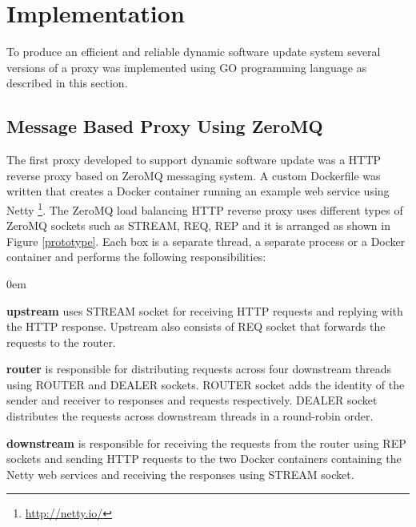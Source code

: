 \documentclass[a4paper,11pt,twoside]{article}
\begin{document}
\clearpage
\section{Implementation} \label{Implementation}
To produce an efficient and reliable dynamic software update system several versions of a proxy was implemented using GO programming language as described in this section. 

\subsection{Message Based Proxy Using ZeroMQ}
The first proxy developed to support dynamic software update was a HTTP reverse proxy based on ZeroMQ messaging system. A custom Dockerfile was written that creates a Docker container running an example web service using Netty \footnote{\url{http://netty.io/}}. The ZeroMQ load balancing HTTP reverse proxy uses different types of ZeroMQ sockets such as STREAM, REQ, REP and it is arranged as shown in Figure \ref{prototype}. Each box is a separate thread, a separate process or a Docker container and performs the following responsibilities:
 
\begin{list}{-}{}
  \itemsep0em
  \item \textbf{upstream} uses STREAM socket for receiving HTTP requests and replying with the HTTP response. Upstream also consists of REQ socket that forwards the requests to the router. 
  
  \item \textbf{router} is responsible for distributing requests across four downstream threads using ROUTER and DEALER sockets. ROUTER socket adds the identity of the sender and receiver to responses and requests respectively. DEALER socket distributes the requests across downstream threads in a round-robin order.
 
  \item \textbf{downstream} is responsible for receiving the requests from the router using REP sockets and sending HTTP requests to the two Docker containers containing the Netty web services and receiving the responses using STREAM socket.
\end{list}
\end{document}
